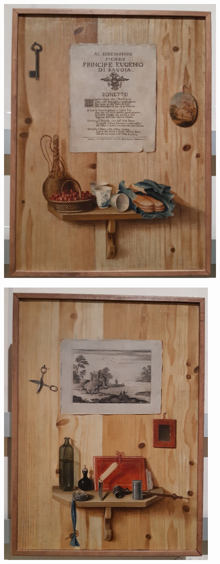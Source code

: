 \documentclass[12pt,a4paper]{article}
\begin{document}
\begin{enumerate}
	\begin{minipage}{\linewidth}
		\centering
		\begin{minipage}{0.4\linewidth}
			\includegraphics[scale=1.3]{Trompe_savoiardi.jpg}
		\end{minipage}
		\hfill
		\begin{minipage}{0.4\linewidth}
			\includegraphics[scale=1.3]{Trompe_pipa.jpg}
		\end{minipage}
	\end{minipage}
	

\end{enumerate}
\end{document}
